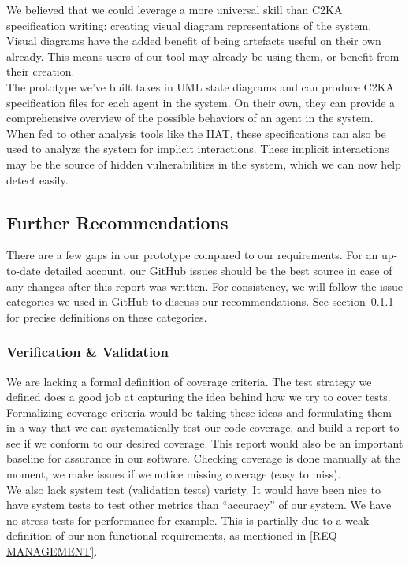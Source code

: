 \documentclass[11pt]{article}
\begin{document}
    We believed that we could leverage a more universal skill than C2KA specification writing:
    creating visual diagram representations of the system.
    Visual diagrams have the added benefit of being artefacts useful on their own already.
    This means users of our tool may already be using them, or benefit from their creation.\\

    The prototype we've built takes in UML state diagrams and can produce C2KA specification files for each agent in the system.
    On their own, they can provide a comprehensive overview of the possible behaviors of an agent in the system.
    When fed to other analysis tools like the IIAT,
    these specifications can also be used to analyze the system for implicit interactions.
    These implicit interactions may be the source of hidden vulnerabilities in the system,
    which we can now help detect easily.

    \subsection{Further Recommendations}
    There are a few gaps in our prototype compared to our requirements.
    For an up-to-date detailed account, our GitHub issues should be the best source in case of any changes after this report was written.
    For consistency, we will follow the issue categories we used in GitHub to discuss our recommendations.
    See section~\ref{} for precise definitions on these categories.

    \subsubsection{Verification \& Validation}
    We are lacking a formal definition of coverage criteria.
    The test strategy we defined does a good job at capturing the idea behind how we try to cover tests.
    Formalizing coverage criteria would be taking these ideas and formulating them in a way that we can systematically
    test our code coverage, and build a report to see if we conform to our desired coverage.
    This report would also be an important baseline for assurance in our software.
    Checking coverage is done manually at the moment, we make issues if we notice missing coverage (easy to miss). \\

    We also lack system test (validation tests) variety.
    It would have been nice to have system tests to test other metrics than ``accuracy'' of our system.
    We have no stress tests for performance for example.
    This is partially due to a weak definition of our non-functional requirements, as mentioned in \ref{REQ MANAGEMENT}. \\
\end{document}
